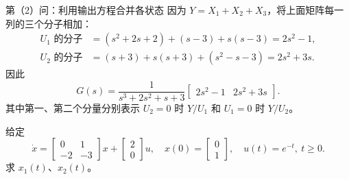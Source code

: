 \documentclass[11pt]{article}
\begin{document}
\begin{solution}
\pagebreak
\begin{proofstep}{第（2）问：利用输出方程合并各状态}
因为 $Y=X_1+X_2+X_3$，将上面矩阵每一列的三个分子相加：
\begin{align*}
U_1\text{ 的分子}&=(s^2+2s+2)+(s-3)+s(s-3)=2s^2-1,\\
U_2\text{ 的分子}&=(s+3)+s(s+3)+(s^2-s-3)=2s^2+3s.
\end{align*}
因此
\[
\boxed{G(s)=\frac{1}{s^3+2s^2+s+3}
\begin{bmatrix}2s^2-1&2s^2+3s\end{bmatrix}.}
\]
其中第一、第二个分量分别表示 $U_2=0$ 时 $Y/U_1$ 和 $U_1=0$ 时 $Y/U_2$。
\end{proofstep}
\end{solution}

\begin{problem}[原题 10：非零初始条件下的状态响应]
给定
\[
\dot x=\begin{bmatrix}0&1\\-2&-3\end{bmatrix}x+
\begin{bmatrix}2\\0\end{bmatrix}u,\quad
x(0)=\begin{bmatrix}0\\1\end{bmatrix},\quad u(t)=e^{-t},\ t\geq0.
\]
求 $x_1(t)$、$x_2(t)$。
\end{problem}
\end{document}
